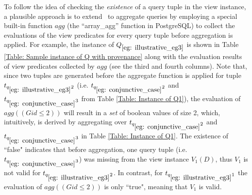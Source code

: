 \begin{example}
To follow the idea of checking the {\em existence} of a query tuple in the view instance, a plausible approach is to extend \rba\ to aggregate queries by employing a special built-in function $agg$ (the ``array\_agg'' function in PostgreSQL) to collect the evaluations of the view predicates for every query tuple before aggregation is applied. For example, the instance of $Q_{\ref{eg: illustrative_eg3}}$ is shown in Table \ref{Table: Sample instance of Q with provenance}  along with the evaluation results of view predicates collected by $agg$ (see the third and fourth columns). Note that, since two tuples are generated before the aggregate function is applied for tuple $t_{q_{\ref{eg: illustrative_eg3}}2}$ (i.e. $t_{q_{\ref{eg: conjunctive_case}}2}$ and $t_{q_{\ref{eg: conjunctive_case}}3}$ from Table \ref{Table: Instance of Q1}), the evaluation of $agg((Gid\leq2))$ will result in a {\em set} of boolean values of size 2, which, intuitively, is derived by aggregating over $t_{q_{\ref{eg: conjunctive_case}}2}$ and $t_{q_{\ref{eg: conjunctive_case}}3}$ in Table \ref{Table: Instance of Q1}. The existence of ``false" indicates that before aggregation, one query tuple (i.e. $t_{q_{\ref{eg: conjunctive_case}}3}$) was missing from the view instance $V_1(D)$, thus $V_1$ %
is not valid for $t_{q_{\ref{eg: illustrative_eg3}}2}$. In contrast, for $t_{q_{\ref{eg: illustrative_eg3}}1}$ the evaluation of $agg((Gid\leq2))$ is only ``true", meaning that $V_1$ is valid.



\end{example}
